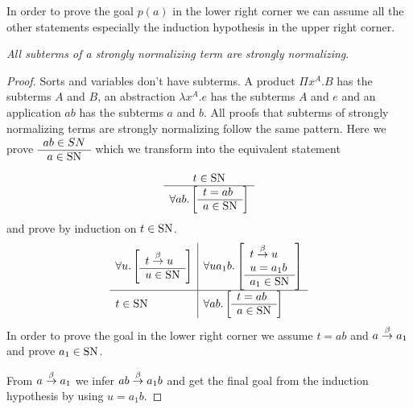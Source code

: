 In order to prove the goal $p(a)$ in the lower right corner we can assume all
the other statements especially the induction hypothesis in the upper right
corner.



\begin{theorem}
    \label{StronglyNormalizingSubterm}
    \emph{All subterms of a strongly normalizing term are strongly normalizing}.
    \begin{proof} Sorts and variables don't have subterms. A product $\Pi
        x^A.B$ has the subterms $A$ and $B$, an abstraction $\lambda x^A.e$ has
        the subterms $A$ and $e$ and an application $ab$ has the subterms $a$
        and $b$. All proofs that subterms of strongly normalizing terms are
        strongly normalizing follow the same pattern. Here we prove $\begin{array}{c} ab
        \in SN \\ \hline a \in \text{SN}\end{array}$ which we transform into the equivalent statement
        $$
        \begin{array}{c} 
            t \in \text{SN}
         \\ \hline 
            \forall ab. \left[ \begin{array}{l} t = ab \\ \hline a \in \text{SN}\end{array} \right]
        \end{array}
        $$
        and prove by induction on $t \in \text{SN}$.
        $$
        \begin{array}{l|l} \forall u. \left[ \begin{array}{l} t \stackrel{\beta}{\to} u \\ \hline u \in \text{SN}\end{array} \right] & \forall u a_1 b. \left[ \begin{array}{l} t \stackrel{\beta}{\to} u \\ u = a_1 b \\ \hline a_1 \in \text{SN}\end{array} \right] \\ \hline t \in \text{SN} & \forall ab. \left[ \begin{array}{l} t = ab \\ \hline a \in \text{SN}\end{array} \right] \end{array}
        $$
        In order to prove the goal in the lower right corner we assume $t = ab$
        and $a \stackrel{\beta}{\to} a_1$ and prove $a_1 \in \text{SN}$.

        From $a \stackrel{\beta}{\to} a_1$ we infer $ab \stackrel{\beta}{\to} a_1 b$ and get the final goal
        from the induction hypothesis by using $u = a_1 b$.
    \end{proof}
\end{theorem}






